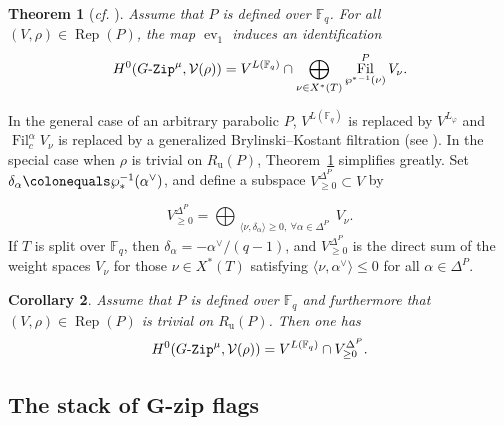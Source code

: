 \documentclass[11pt]{amsart}
\numberwithin{equation}{section}
\newtheorem{theorem}{Theorem}[section]
\newtheorem{corollary}[theorem]{Corollary}
\theoremstyle{definition}
\theoremstyle{remark}
\newcommand{\GZip}{\mathop{\text{$G$-{\tt Zip}}}\nolimits}
\newcommand{\Vcal}{{\mathcal V}}
\newcommand{\FF}{\mathbb{F}}
\DeclareMathOperator{\Rep}{Rep}
\DeclareMathOperator{\fil}{Fil}
\DeclareMathOperator{\Fil}{Fil}
\DeclareMathOperator{\ev}{ev}
\begin{document}
\begin{theorem}[\textit{cf.} {\cite[Corollary 3.4.2]{Imai-Koskivirta-vector-bundles}}]\label{main-Fq}
Assume that $P$ is defined over $\FF_q$. 
For all $(V,\rho)\in \Rep(P)$, the map $\ev_1$ induces an identification
\begin{equation}
H^0(\GZip^\mu,\Vcal(\rho))=V^{L(\FF_q)}\cap 
 \bigoplus_{\nu \in X^*(T)} 
 \fil_{{\wp^*}^{-1}(\nu)}^P 
 V_{\nu}.
\end{equation}
\end{theorem}

In the general case of an arbitrary parabolic $P$, $V^{L(\FF_q)}$ is replaced by $V^{L_\varphi}$ and $\Fil^\alpha_c V_\nu$ is replaced by a generalized Brylinski--Kostant filtration (see \cite[Theorem 3.4.1]{Imai-Koskivirta-vector-bundles}). In the special case when $\rho$ is trivial on $R_{\mathrm{u}}(P)$, Theorem~\ref{main-Fq} simplifies greatly. Set $\delta_{\alpha}\colonequals \wp_*^{-1}(\alpha^\vee)$, and define a subspace $V_{\geq 0}^{\Delta^P}\subset V$ by

\begin{equation}\label{equ-VDeltaP}
V_{\geq 0}^{\Delta^P} = \bigoplus_{\substack{\langle \nu,\delta_{\alpha} \rangle \geq 0, \ 
 \forall \alpha\in \Delta^P}} V_\nu.
\end{equation}
If $T$ is split over $\FF_q$, then 
$\delta_{\alpha}=-\alpha^\vee /(q-1)$, 
and $V_{\geq 0}^{\Delta^P}$ is the direct sum of the weight spaces $V_\nu$ for those $\nu\in X^*(T)$ satisfying $\langle \nu,\alpha^\vee \rangle \leq 0$ for all $\alpha \in \Delta^P$. 


\begin{corollary}\label{cor-Fq-Levi}
Assume that $P$ is defined over $\FF_q$ and furthermore that $(V,\rho)\in \Rep(P)$ is trivial on $R_{\mathrm{u}}(P)$. Then one has
\begin{equation}
H^0(\GZip^\mu,\Vcal(\rho))=V^{L(\FF_q)}\cap V_{\geq 0}^{\Delta^P} .
\end{equation}
\end{corollary}



\subsection{The stack of $\boldsymbol{G}$-zip flags} \label{subsec-zipflag}
\end{document}
